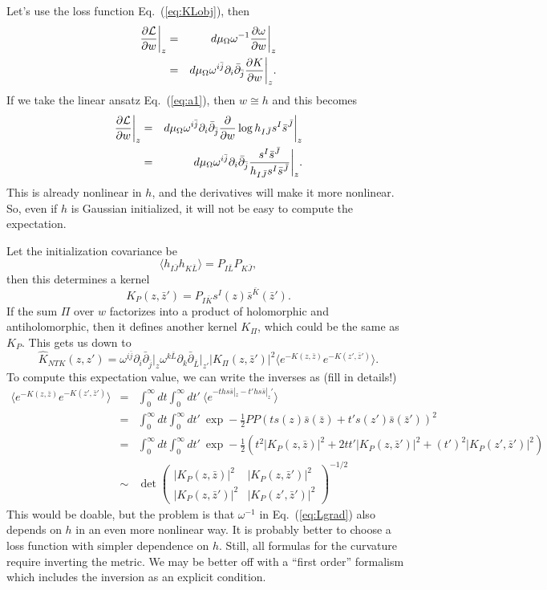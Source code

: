 \documentclass[12pt]{article}
\def\CL {{\cal L}}
\def\vev#1{\bigg\langle #1 \bigg\rangle}
\def\half{\frac{1}{2}}
\newcommand{\eq}[1]{Eq.~(\ref{eq:#1})}
\newcommand{\be}{\begin{equation}}
\newcommand{\ee}{\end{equation}}
\newcommand{\bea}{\begin{eqnarray}}
\newcommand{\eea}{\end{eqnarray}}
\def\bz{\bar{z}}
\def\bj{{\bar{j}}}
\def\bs{{\bar{s}}}
\def\bz{\bar{z}}
\def\bJ{{\bar{J}}}
\def\bK{{\bar{K}}}
\def\bL{{\bar{L}}}
\def\hK{{\hat K}}
\begin{document}
Let's use the loss function \eq{KLobj}, then
\bea
\frac{\partial\CL}{\partial w}\bigg|_z &=& d\mu_\Omega \omega^{-1} \frac{\partial\omega}{\partial w}\bigg|_z \\
&=& d\mu_\Omega \omega^{i\bj} \partial_i \bar\partial_\bj \frac{\partial K}{\partial w}\bigg|_z .
\eea
If we take the linear ansatz \eq{a1}, then $w\cong h$ and this becomes
\bea \label{eq:Lgrad}
\frac{\partial\CL}{\partial w}\bigg|_z &=& d\mu_\Omega \omega^{i\bj} \partial_i \bar\partial_\bj 
\frac{\partial }{\partial w} \log h_{I\bJ} s^I \bs^\bJ  \bigg|_z \\
&=& d\mu_\Omega \omega^{i\bj} \partial_i \bar\partial_\bj 
\frac{s^I \bs^\bJ }{ h_{I\bJ} s^I \bs^\bJ }  \bigg|_z .
\eea
This is already nonlinear in $h$, and the derivatives will make it more nonlinear.
So, even if $h$ is Gaussian initialized, it will not be easy to compute the expectation.

Let the initialization covariance be
\be
\vev{h_{I\bJ} h_{K\bL}} = P_{I\bL} P_{K\bJ} ,
\ee
then this determines a kernel
\be
K_P(z,\bz') = P_{I\bK} s^I(z) \bs^\bK(\bz') .
\ee
If the sum $\Pi$ over $w$ factorizes into a product of holomorphic and antiholomorphic,
then it defines another kernel $K_\Pi$, which could be the same as $K_P$.
This gets us down to
\be
\hK_{NTK}(z,z') = \omega^{i\bj} \partial_i \bar\partial_\bj  \bigg|_z
\omega^{k\bL} \partial_k \bar\partial_\bL \bigg|_{z'} |K_\Pi(z,\bz')|^2 \vev{ e^{-K{(z,\bz)}} e^{-K{(z',\bz')}} }.
\ee
To compute this expectation value, we can write the inverses as (fill in details!)
\bea
 \vev{ e^{-K{(z,\bz)}} e^{-K{(z',\bz')}} } &=& \int_0^\infty dt \int_0^\infty dt' \ \vev{ e^{-ths\bs|_z-t'hs\bs|_z'} } \\
 &=& \int_0^\infty dt \int_0^\infty dt' \ \exp -\half P P\left( t s(z)\bs(\bz) + t' s(z') \bs(\bz') \right)^2 \\
 \nonumber
 &=& \int_0^\infty dt \int_0^\infty dt' \ \exp -\half\left( t^2 |K_P(z,\bz)|^2 + 2tt' |K_P(z,\bz')|^2 + (t')^2|K_P(z',\bz')|^2
 \right) \\
 &\sim& \det\left(\begin{matrix} 
 |K_P(z,\bz)|^2 & |K_P(z,\bz')|^2 \\
 |K_P(z,\bz')|^2 & |K_P(z',\bz')|^2 \end{matrix} \right)^{-1/2}
\eea
This would be doable, but the problem is that $\omega^{-1}$ in \eq{Lgrad} also depends on $h$ in an
even more nonlinear way.  It is probably better to choose a loss function with simpler dependence on $h$.
Still, all formulas for the curvature require inverting the metric.
We may be better off with a ``first order'' formalism which includes the inversion as an explicit condition.
\end{document}
